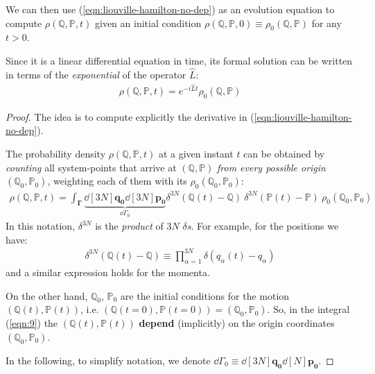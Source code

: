 \documentclass[../../main.tex]{subfiles}
\begin{document}
We can then use (\ref{eqn:liouville-hamilton-no-dep}) as an evolution equation to compute $\rho(\mathbb{Q},\mathbb{P},t)$ given an initial condition $\rho(\mathbb{Q},\mathbb{P},0) \equiv \rho_0(\mathbb{Q},\mathbb{P})$ for any $t > 0$.

Since it is a linear differential equation in time, its formal solution can be written in terms of the \textit{exponential} of the operator $\hat{L}$:
\begin{align*}
    \rho(\mathbb{Q},\mathbb{P},t) = e^{-i \hat{L} t} \rho_0(\mathbb{Q},\mathbb{P})
\end{align*} 

\begin{proof}
    The idea is to compute explicitly the derivative in (\ref{eqn:liouville-hamilton-no-dep}).
    
    \medskip
    
    The probability density $\rho(\mathbb{Q},\mathbb{P},t)$ at a given instant $t$ can be obtained by \textit{counting} all system-points that arrive at $(\mathbb{Q},\mathbb{P})$ \textit{from every possible origin} $(\mathbb{Q}_0,\mathbb{P}_0)$, weighting each of them with its  $\rho_0(\mathbb{Q}_0, \mathbb{P}_0)$:
    \begin{align}\label{eqn:9}
        \rho(\mathbb{Q},\mathbb{P},t) = \int_{\bm{\Gamma}} \underbrace{\dd[3N]{\bm{q_0}} \dd[3N]{\bm{p_0}} }_{\dd{\Gamma_0} } \delta^{3N} (\mathbb{Q}(t)- \mathbb{Q}) \> \delta^{3N}(\mathbb{P}(t) - \mathbb{P}) \> \rho_0(\mathbb{Q}_0, \mathbb{P}_0)
    \end{align}
    In this notation, $\delta^{3N}$ is the \textit{product} of $3N$ $\delta$\textit{s}. For example, for the positions we have:  %
    \begin{align*}
        \delta^{3N}(\mathbb{Q}(t) - \mathbb{Q}) \equiv \prod_{\alpha=1}^{3N} \delta(q_\alpha(t) - q_\alpha) 
    \end{align*}
    and a similar expression holds for the momenta.

    On the other hand, $\mathbb{Q}_0$, $\mathbb{P}_0$ are the initial conditions for the motion $(\mathbb{Q}(t), \mathbb{P}(t))$, i.e. $(\mathbb{Q}(t=0), \mathbb{P}(t=0)) = (\mathbb{Q}_0, \mathbb{P}_0)$. So, in the integral (\ref{eqn:9}) the $(\mathbb{Q}(t), \mathbb{P}(t))$ \textbf{depend} (implicitly) on the origin coordinates $(\mathbb{Q}_0, \mathbb{P}_0)$. 

    In the following, to simplify notation, we denote $\dd{\Gamma_0} \equiv \dd[3N]{\bm{q_0}} \dd[N]{\bm{p_0}}$. 


\end{proof}
\end{document}
